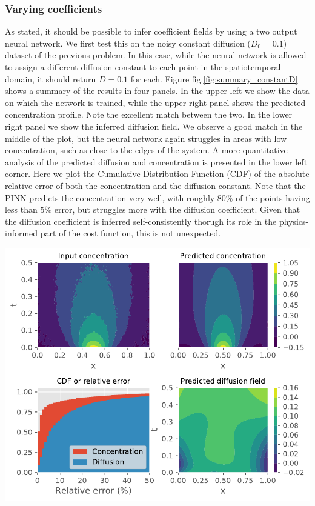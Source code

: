 \documentclass{Dissertate}
\let\origfigure\figure
\let\endorigfigure\endfigure
\renewenvironment{figure}[1][2] {
    \expandafter\origfigure\expandafter[H]
} {
    \endorigfigure
}
\begin{document}
\hypertarget{varying-coefficients}{%
\subsubsection{Varying coefficients}\label{varying-coefficients}}

As stated, it should be possible to infer coefficient fields by using a
two output neural network. We first test this on the noisy constant
diffusion (\(D_0=0.1\)) dataset of the previous problem. In this case,
while the neural network is allowed to assign a different diffusion
constant to each point in the spatiotemporal domain, it should return
\(D=0.1\) for each. Figure fig.\ref{fig:summary_constantD} shows a
summary of the results in four panels. In the upper left we show the
data on which the network is trained, while the upper right panel shows
the predicted concentration profile. Note the excellent match between
the two. In the lower right panel we show the inferred diffusion field.
We observe a good match in the middle of the plot, but the neural
network again struggles in areas with low concentration, such as close
to the edges of the system. A more quantitative analysis of the
predicted diffusion and concentration is presented in the lower left
corner. Here we plot the Cumulative Distribution Function (CDF) of the
absolute relative error of both the concentration and the diffusion
constant. Note that the PINN predicts the concentration very well, with
roughly \(80\%\) of the points having less than \(5\%\) error, but
struggles more with the diffusion coefficient. Given that the diffusion
coefficient is inferred self-consistently thorugh its role in the
physics-informed part of the cost function, this is not unexpected.

\begin{figure}
\hypertarget{fig:summary_constantD}{%
\centering
\includegraphics{source/figures/pdf/summary_constantD_varyingPINN.pdf}
\caption{We show the training data and predicted concentration profile
in the upper left and right panels. The lower right panel shows the
inferred diffusion field while the lower left panel shows the CDF of the
relative error of the diffusion and
concentration.}\label{fig:summary_constantD}
}
\end{figure}
\end{document}
